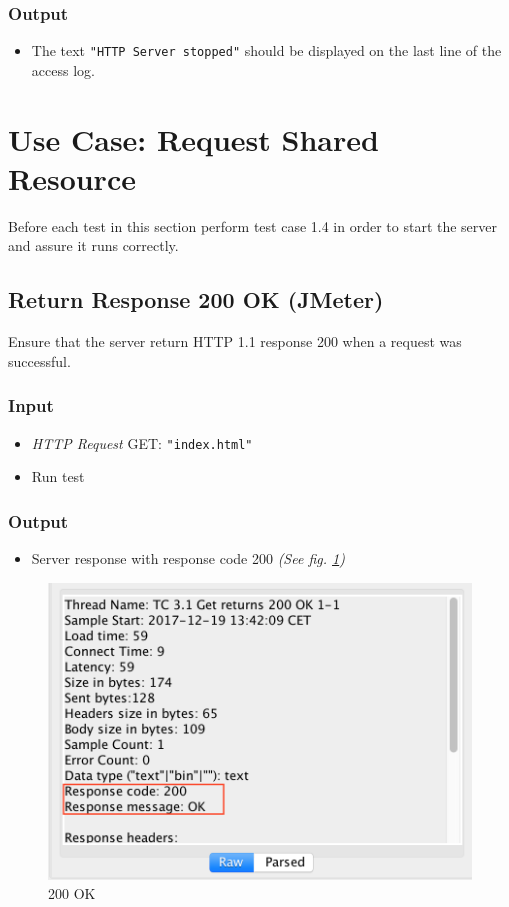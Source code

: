 \documentclass[a4paper, 12pt]{article}
\begin{document}
\subsubsection{Output}
\begin{itemize}
\item The text \texttt{"HTTP Server stopped"} should be displayed on the last line of the access log.
\end{itemize}


\newpage
\section{Use Case: Request Shared Resource}

Before each test in this section perform test case 1.4 in order to start the server and assure it runs correctly.

\subsection{Return Response 200 OK (JMeter)}

Ensure that the server return HTTP 1.1 response 200 when a request was successful.

\subsubsection{Input}
\begin{itemize}
\item \textit{HTTP Request} GET: \texttt{"index.html"}
\item Run test
\end{itemize}

\subsubsection{Output}
\begin{itemize}
\item Server response with response code 200 \textit{(See fig. \ref{TC3.1})}
\end{itemize}

\begin{figure}[H]
\centering
\includegraphics[scale=0.7]{output_clarification/200OK.png} 
\caption{200 OK}
\label{TC3.1}
\end{figure}
\end{document}
